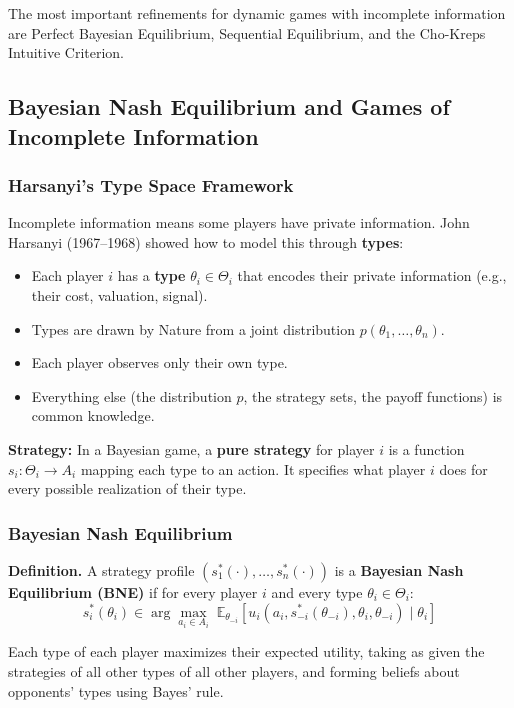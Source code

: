 \documentclass[hidelinks]{article}
\begin{document}
The most important refinements for dynamic games with incomplete information are Perfect Bayesian Equilibrium, Sequential Equilibrium, and the Cho-Kreps Intuitive Criterion.

\subsection{Bayesian Nash Equilibrium and Games of Incomplete Information}

\subsubsection{Harsanyi's Type Space Framework}

Incomplete information means some players have private information. John Harsanyi (1967--1968) showed how to model this through \textbf{types}:

\begin{itemize}
    \item Each player $i$ has a \textbf{type} $\theta_i \in \Theta_i$ that encodes their private information (e.g., their cost, valuation, signal).
    \item Types are drawn by Nature from a joint distribution $p(\theta_1, \ldots, \theta_n)$.
    \item Each player observes only their own type.
    \item Everything else (the distribution $p$, the strategy sets, the payoff functions) is common knowledge.
\end{itemize}

\textbf{Strategy:} In a Bayesian game, a \textbf{pure strategy} for player $i$ is a function $s_i : \Theta_i \to A_i$ mapping each type to an action. It specifies what player $i$ does for every possible realization of their type.

\subsubsection{Bayesian Nash Equilibrium}

\textbf{Definition.} A strategy profile $(s_1^*(\cdot), \ldots, s_n^*(\cdot))$ is a \textbf{Bayesian Nash Equilibrium (BNE)} if for every player $i$ and every type $\theta_i \in \Theta_i$:
\[
s_i^*(\theta_i) \in \arg\max_{a_i \in A_i} \; \mathbb{E}_{\theta_{-i}}\left[u_i(a_i, s_{-i}^*(\theta_{-i}), \theta_i, \theta_{-i}) \mid \theta_i\right]
\]

Each type of each player maximizes their expected utility, taking as given the strategies of all other types of all other players, and forming beliefs about opponents' types using Bayes' rule.
\end{document}
